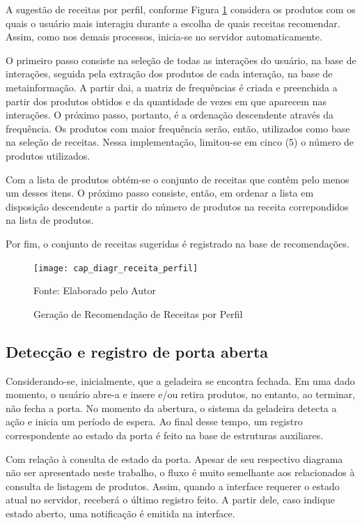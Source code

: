 A sugestão de receitas por perfil, conforme Figura \ref{fig:cap_diagr_receita_perfil} considera os produtos com os quais o usuário mais interagiu durante a escolha de quais receitas recomendar. Assim, como nos demais processos, inicia-se no servidor automaticamente. 

O primeiro passo consiste na seleção de todas as interações do usuário, na base de interações, seguida pela extração dos produtos de cada interação, na base de metainformação. A partir dai, a matriz de frequências é criada e preenchida a partir dos produtos obtidos e da quantidade de vezes em que aparecem nas interações. O próximo passo, portanto, é a ordenação descendente através da frequência. Os produtos com maior frequência serão, então, utilizados como base na seleção de receitas. Nessa implementação, limitou-se em cinco (5) o número de produtos utilizados.

Com a lista de produtos obtém-se o conjunto de receitas que contêm pelo menos um desses itens. O próximo passo consiste, então, em ordenar a lista em disposição descendente a partir do número de produtos na receita correpondidos na lista de produtos.

Por fim, o conjunto de receitas sugeridas é registrado na base de recomendações.

\begin{figure}[htb]
    \caption{Geração de Recomendação de Receitas por Perfil} 
    \label{fig:cap_diagr_receita_perfil}
    \texttt{[image: cap\_diagr\_receita\_perfil]}
    
    \footnotesize{Fonte: Elaborado pelo Autor}
\end{figure}


\subsection{Detecção e registro de porta aberta}

Considerando-se, inicialmente, que a geladeira se encontra fechada. Em uma dado momento, o usuário abre-a e insere e/ou retira produtos, no entanto, ao terminar, não fecha a porta.  No momento da abertura, o sistema da geladeira detecta a ação e inicia um período de espera. Ao final desse tempo, um registro correspondente ao estado da porta é feito na base de estruturas auxiliares.

Com relação à consulta de estado da porta. Apesar de seu respectivo diagrama não ser apresentado neste trabalho, o fluxo é muito semelhante aos relacionados à consulta de listagem de produtos. Assim, quando a interface requerer o estado atual no servidor, receberá o último registro feito. A partir dele, caso indique estado aberto, uma notificação é emitida na interface.

